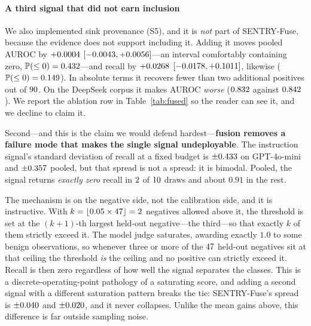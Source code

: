 \documentclass[preprint,12pt,authoryear]{elsarticle}
\theoremstyle{definition}
\newcommand{\Prob}{\mathbb{P}}
\begin{document}
\paragraph{A third signal that did not earn inclusion} We also implemented
sink provenance (S5), and it is \emph{not} part of SENTRY-Fuse, because the evidence
does not support including it. Adding it moves pooled AUROC by $+0.0004$
$[-0.0043, +0.0056]$---an interval comfortably containing zero,
$\Prob(\le 0) = \BootSfiveAurocP$---and recall by $+0.0268$
$[-0.0178, +0.1011]$, likewise ($\Prob(\le 0) = \BootSfiveTprP$). In
absolute terms it recovers fewer than two additional positives out of $90$. On
the DeepSeek corpus it makes AUROC \emph{worse} ($0.832$ against
$0.842$). We report the ablation row in Table~\ref{tab:fused} so the reader
can see it, and we decline to claim it.

Second---and this is the claim we would defend hardest---\textbf{fusion removes a
failure mode that makes the single signal undeployable}. The instruction signal's
standard deviation of recall at a fixed budget is $\pm 0.433$ on
GPT-4o-mini and $\pm 0.357$ pooled, but that spread is not a spread: it
is bimodal. Pooled, the signal returns \emph{exactly zero} recall in
$2$ of $10$ draws and about $0.91$ in the rest.

The mechanism is on the negative side, not the calibration side, and it is
instructive. With $k = \lfloor 0.05 \times 47 \rfloor = 2$ negatives allowed
above it, the threshold is set at the $(k+1)$-th largest held-out negative---the
third---so that exactly $k$ of them strictly exceed it. The model judge saturates,
awarding exactly $1.0$ to some benign observations, so whenever three or more of
the $47$ held-out negatives sit at that ceiling the threshold \emph{is} the
ceiling and no positive can strictly exceed it. Recall is then zero regardless of
how well the signal separates the classes. This is a discrete-operating-point
pathology of a saturating score, and adding a second signal with a different
saturation pattern breaks the tie: SENTRY-Fuse's spread is
$\pm 0.040$ and $\pm 0.020$, and it never collapses. Unlike the
mean gains above, this difference is far outside sampling noise.
\end{document}
